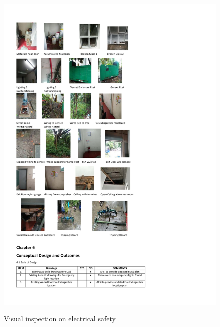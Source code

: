 \begin{figure}
	\includegraphics[scale=0.8]{figures/ch04_fig_fdas04} \\
	\caption{Visual inspection on electrical safety}
	\label{ch04_fig_fdas04} 
\end{figure}